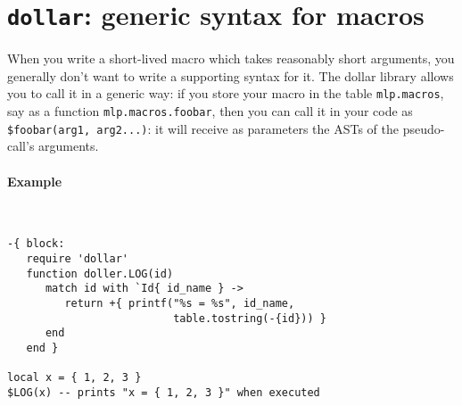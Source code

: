 \section[Dollar extension]{{\tt dollar}: generic syntax for macros}
When you write a short-lived macro which takes reasonably short arguments, you
generally don't want to write a supporting syntax for it. The dollar library
allows you to call it in a generic way: if you store your macro in the table
{\tt mlp.macros}, say as a function {\tt mlp.macros.foobar}, then you can call it
in your code as {\tt\$foobar(arg1, arg2...)}: it will receive as parameters the
ASTs of the pseudo-call's arguments.

\paragraph{Example}~
\begin{verbatim}
-{ block:
   require 'dollar'
   function doller.LOG(id)
      match id with `Id{ id_name } -> 
         return +{ printf("%s = %s", id_name, 
                          table.tostring(-{id})) }
      end
   end }

local x = { 1, 2, 3 }
$LOG(x) -- prints "x = { 1, 2, 3 }" when executed
\end{verbatim}
